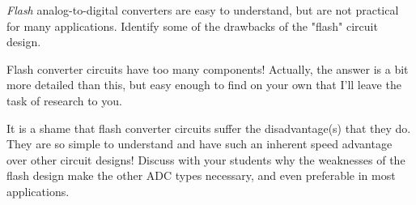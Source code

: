 

{\it Flash} analog-to-digital converters are easy to understand, but are not practical for many applications.  Identify some of the drawbacks of the "flash" circuit design.







Flash converter circuits have too many components!  Actually, the answer is a bit more detailed than this, but easy enough to find on your own that I'll leave the task of research to you.







It is a shame that flash converter circuits suffer the disadvantage(s) that they do.  They are so simple to understand and have such an inherent speed advantage over other circuit designs!  Discuss with your students why the weaknesses of the flash design make the other ADC types necessary, and even preferable in most applications.




